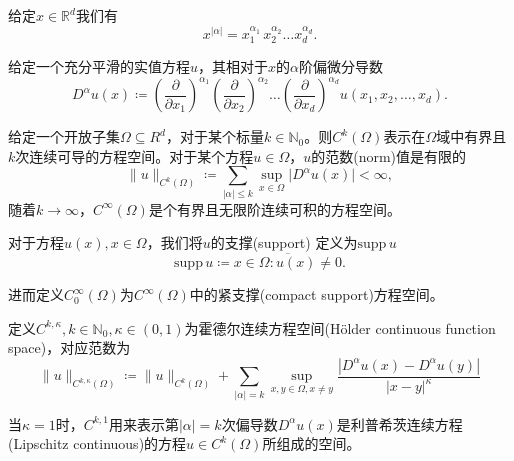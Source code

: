 给定$x \in \mathbb{R}^d$我们有
\begin{equation*}
  x^{\left| \alpha \right|} = x_1^{\alpha_1} \, x_2^{\alpha_2} \ldots x_d^{\alpha_d}.
\end{equation*}

给定一个充分平滑的实值方程$u$，其相对于$x$的$\alpha$阶偏微分导数
\begin{equation*}
  D^{\alpha} u(x) \coloneqq \left( \frac{\partial }{\partial x_{1}} \right)^{\alpha_1} \left( \frac{\partial }{\partial x_{2}} \right)^{\alpha_2} \ldots \left( \frac{\partial }{\partial x_{d}} \right)^{\alpha_d} u \left( x_1, x_2, \ldots, x_d \right).
\end{equation*}

给定一个开放子集$\Omega \subseteq R^{d}$，对于某个标量$k \in \mathbb{N}_0$。则$C^{k}(\Omega)$表示在$\Omega$域中有界且$k$次连续可导的方程空间。对于某个方程$u \in \Omega$，$u$的范数(norm)值是有限的
\begin{equation*}
  \| u \|_{C^{k}(\Omega)} \coloneqq \sum_{\left| \alpha \right| \le k} \sup_{x \in \Omega} \big| D^{\alpha} u(x) \big| < \infty,
\end{equation*}
随着$k \rightarrow \infty$，$C^{\infty}(\Omega)$是个有界且无限阶连续可积的方程空间。

对于方程$u(x), x \in \Omega$，我们将$u$的支撑(support) 定义为$\text{supp} \, u$
\begin{equation*}
  \text{supp} \, u \coloneqq \overline{x \in \Omega: u(x) \neq 0}.
\end{equation*}

进而定义$C_0^{\infty}(\Omega)$为$C^{\infty}(\Omega)$中的紧支撑(compact support)方程空间。

定义$C^{k,\kappa}, k \in \mathbb{N}_0, \kappa \in (0,1)$为霍德尔连续方程空间(Hölder continuous function space)，对应范数为
\begin{equation*}
  \| u \|_{C^{k,\kappa}(\Omega)} \coloneqq \| u \|_{C^{k}(\Omega)} + \sum_{\left| \alpha \right| = k} \sup_{x,y\in\Omega, x \neq y} \frac{\left| D^{\alpha}u(x)-D^{\alpha}u(y) \right|}{\left| x - y \right|^{\kappa}}
\end{equation*}

当$\kappa=1$时，$C^{k,1}$用来表示第$\left| \alpha \right|=k$次偏导数$D^{\alpha}u(x)$是利普希茨连续方程(Lipschitz continuous)的方程$u \in C^{k}(\Omega)$所组成的空间。

